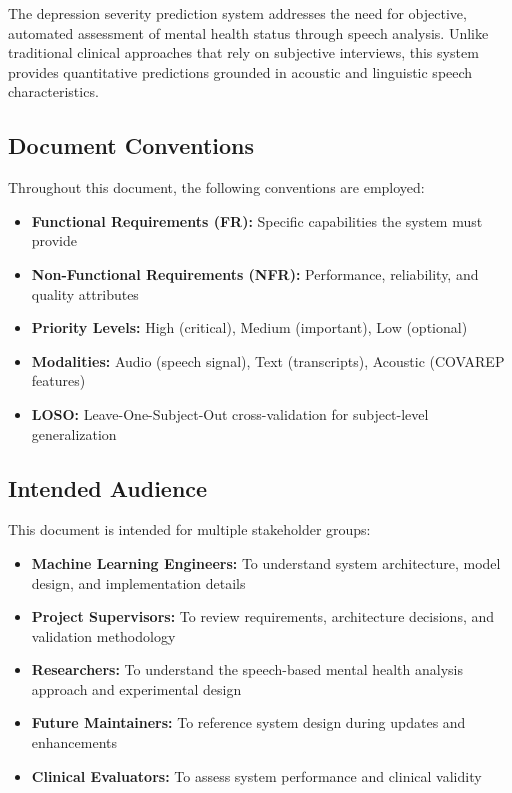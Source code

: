 \documentclass[12pt]{article}
\begin{document}
	The depression severity prediction system addresses the need for objective, automated assessment of mental health status through speech analysis. Unlike traditional clinical approaches that rely on subjective interviews, this system provides quantitative predictions grounded in acoustic and linguistic speech characteristics.

	\subsection{Document Conventions}

	Throughout this document, the following conventions are employed:

	\begin{itemize}
		\item \textbf{Functional Requirements (FR):} Specific capabilities the system must provide
		\item \textbf{Non-Functional Requirements (NFR):} Performance, reliability, and quality attributes
		\item \textbf{Priority Levels:} High (critical), Medium (important), Low (optional)
		\item \textbf{Modalities:} Audio (speech signal), Text (transcripts), Acoustic (COVAREP features)
		\item \textbf{LOSO:} Leave-One-Subject-Out cross-validation for subject-level generalization
	\end{itemize}

	\subsection{Intended Audience}

	This document is intended for multiple stakeholder groups:

	\begin{itemize}
		\item \textbf{Machine Learning Engineers:} To understand system architecture, model design, and implementation details
		\item \textbf{Project Supervisors:} To review requirements, architecture decisions, and validation methodology
		\item \textbf{Researchers:} To understand the speech-based mental health analysis approach and experimental design
		\item \textbf{Future Maintainers:} To reference system design during updates and enhancements
		\item \textbf{Clinical Evaluators:} To assess system performance and clinical validity
	\end{itemize}
\end{document}
